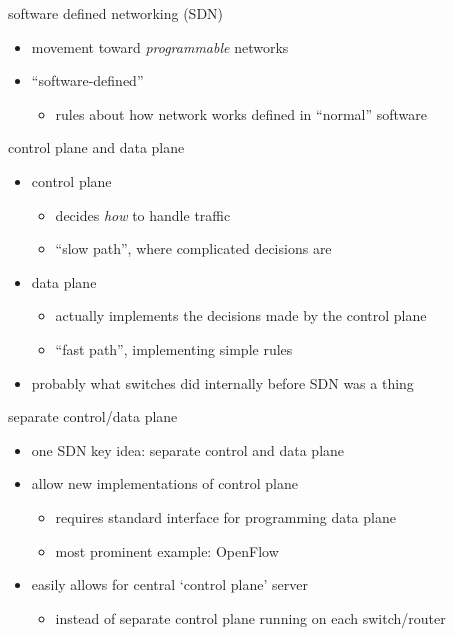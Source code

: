 \begin{frame}{software defined networking (SDN)}
    \begin{itemize}
    \item movement toward \textit{programmable} networks
    \vspace{.5cm}
    \item ``software-defined''
        \begin{itemize}
        \item rules about how network works defined in ``normal'' software
        \end{itemize}
    \end{itemize}
\end{frame}

\begin{frame}{control plane and data plane}
    \begin{itemize}
    \item control plane
        \begin{itemize}
        \item decides \textit{how} to handle traffic
        \item ``slow path'', where complicated decisions are
        \end{itemize}
    \item data plane
        \begin{itemize}
        \item actually implements the decisions made by the control plane
        \item ``fast path'', implementing simple rules
        \end{itemize}
    \vspace{.5cm}
    \item probably what switches did internally before SDN was a thing
    \end{itemize}
\end{frame}

\begin{frame}{separate control/data plane}
    \begin{itemize}
    \item one SDN key idea: separate control and data plane
    \item allow new  implementations of control plane
        \begin{itemize}
        \item requires standard interface for programming data plane
        \item most prominent example: OpenFlow
        \end{itemize}
    \item easily allows for central `control plane' server
        \begin{itemize}
        \item instead of separate control plane running on each switch/router
        \end{itemize}
    \end{itemize}
\end{frame}

